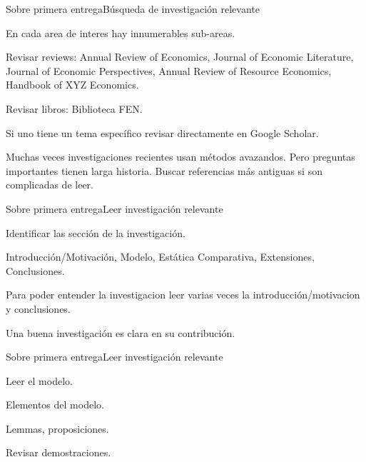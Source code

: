 \documentclass[notes, 11pt]{beamer} %
\newenvironment{wideitemize}{\itemize\addtolength{\itemsep}{10pt}}{\enditemize}
\begin{document}
\begin{frame}{Sobre primera entrega}{B\'usqueda de investigaci\'on relevante}
	\begin{wideitemize}
		\item<1-> En cada area de interes hay innumerables sub-areas.
		\begin{wideitemize}
			\item<2->[--] Revisar reviews: Annual Review of Economics, Journal of Economic Literature, Journal of Economic Perspectives, Annual Review of Resource Economics, Handbook of XYZ Economics.
			\item<3->[--] Revisar libros: Biblioteca FEN.
			\item<4->[--] Si uno tiene un tema espec\'ifico revisar directamente en Google Scholar.
		\end{wideitemize}
		\item<5-> Muchas veces investigaciones recientes usan m\'etodos avazandos. Pero preguntas importantes tienen larga historia. Buscar referencias m\'as antiguas si son complicadas de leer.
	\end{wideitemize}
\end{frame}

\begin{frame}{Sobre primera entrega}{Leer investigaci\'on relevante}
	\begin{wideitemize}
		\item<1-> Identificar las secci\'on de la investigaci\'on.
		\begin{wideitemize}
			\item<2->[--] Introducci\'on/Motivaci\'on, Modelo, Est\'atica Comparativa, Extensiones, Conclusiones.
		\end{wideitemize}
		\item<3-> Para poder entender la investigacion leer varias veces la introducci\'on/motivacion y conclusiones.
		\item<4-> Una buena investigaci\'on es clara en su contribuci\'on.
	\end{wideitemize}
\end{frame}

\begin{frame}{Sobre primera entrega}{Leer investigaci\'on relevante}
	\begin{wideitemize}
		\item<1-> Leer el modelo.
		\begin{wideitemize}
			\item<2->[--] Elementos del modelo.
			\item<3->[--] Lemmas, proposiciones.
			\item<4->[--] Revisar demostraciones.
		\end{wideitemize}
	\end{wideitemize}
\end{frame}
\end{document}
